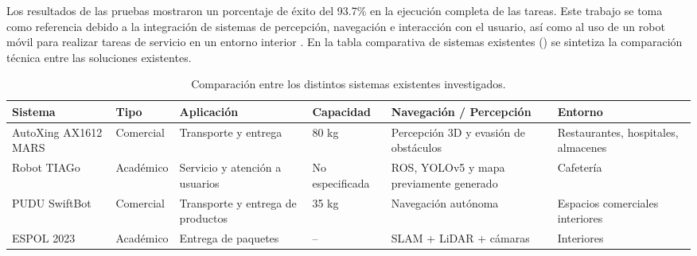 Los resultados de las pruebas mostraron un porcentaje de éxito del 93.7\% en la ejecución completa de las tareas. Este trabajo se toma como referencia debido a la integración de sistemas de percepción, navegación e interacción con el usuario, así como al uso de un robot móvil para realizar tareas de servicio en un entorno interior \cite{EDA8}. En la tabla comparativa de sistemas existentes () se sintetiza la comparación técnica entre las soluciones existentes.


\begin{table}[htbp]
    \centering
    \caption{Comparación entre los distintos sistemas existentes investigados.}
    \label{tab:comparativa_eda}
    \begin{tabularx}{\textwidth}{J{2.5cm} J{1.8cm} Y J{1.8cm} Y J{2.0cm}}
        \toprule
        \textbf{Sistema} & \textbf{Tipo} & \textbf{Aplicación} & \textbf{Capacidad} & \textbf{Navegación / Percepción} & \textbf{Entorno} \\
        \midrule
        AutoXing AX1612 MARS & Comercial & Transporte y entrega & 80 kg & Percepción 3D y evasión de obstáculos & Restaurantes, hospitales, almacenes \\

        Robot TIAGo & Académico & Servicio y atención a usuarios & No especificada & ROS, YOLOv5 y mapa previamente generado & Cafetería \\

        PUDU SwiftBot & Comercial & Transporte y entrega de productos & 35 kg & Navegación autónoma & Espacios comerciales interiores \\

        ESPOL 2023 & Académico & Entrega de paquetes & -- & SLAM + LiDAR + cámaras & Interiores \\
        \bottomrule
    \end{tabularx}
\end{table}
